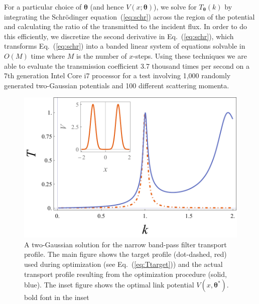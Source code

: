 \documentclass[twocolumn,amsmath,amssymb,showpacs,prl,superscriptaddress,aps]{revtex4-1}
\begin{document}
For a particular choice of $\bm{\theta}$ (and hence $V(x;\bm{\theta})$), we solve for $T_{\bm{\theta}}(k)$ by integrating the Schr{\"o}dinger equation~(\ref{eq:schr}) across the region of the potential and calculating the ratio of the transmitted to the incident flux. In order to do this efficiently, we discretize the second derivative in Eq.~(\ref{eq:schr}), which transforms Eq.~(\ref{eq:schr}) into
a banded linear system of equations solvable in $O(M)$ time where $M$ is the number of $x$-steps. Using these techniques we are able to evaluate the transmission coefficient 3.7 thousand times per second on a 7th generation Intel Core i7 processor for a test involving 1,000 randomly generated two-Gaussian potentials and 100 different scattering momenta. 

\begin{figure}
   \includegraphics[width=1\linewidth]{figures/plot_transport_profiles_with_inset.pdf}
 \caption[Narrow band-pass filter link potential]{A two-Gaussian solution for the narrow band-pass filter transport profile. The main figure shows the target profile (dot-dashed, red) used during optimization (see Eq.~(\ref{eq:Ttarget})) and the actual transport profile resulting from the optimization procedure (solid, blue). The inset figure shows the optimal link potential $V(x, \bm{\theta^*})$. {\color{red} bold font in the inset}}
 \label{fig:method_illustration}
\end{figure}

\end{document}

